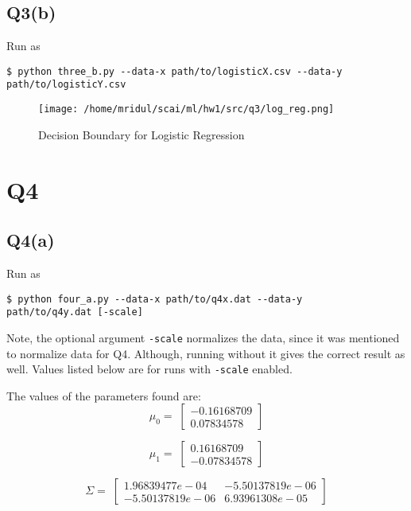\documentclass[11pt]{article}
\begin{document}
\subsection{Q3(b)}
\label{sec:orgeaf4eb5}
\begin{codebox}
Run as
\begin{verbatim}
$ python three_b.py --data-x path/to/logisticX.csv --data-y
path/to/logisticY.csv
\end{verbatim}
\end{codebox}
\begin{figure}[!ht]
\centering
\texttt{[image: /home/mridul/scai/ml/hw1/src/q3/log\_reg.png]}
\caption{\label{fig:org09442ad}Decision Boundary for Logistic Regression}
\end{figure}
\clearpage
\section{Q4}
\label{sec:orgfd67199}
\subsection{Q4(a)}
\label{sec:orgc60505f}
\begin{codebox}
Run as
\begin{verbatim}
$ python four_a.py --data-x path/to/q4x.dat --data-y
path/to/q4y.dat [-scale]
\end{verbatim}
Note, the optional argument \verb|-scale| normalizes the
data, since it was mentioned to normalize data for Q4.
Although, running without it gives the correct result as
well. Values listed below are for runs with \verb|-scale|
enabled.
\end{codebox}
The values of the parameters found are:
\begin{equation*}
\mu_0 = \;
\begin{bmatrix}
-0.16168709\\
0.07834578
\end{bmatrix}
\end{equation*}

\begin{equation*}
\mu_1 = \;
\begin{bmatrix}
0.16168709\\
-0.07834578
\end{bmatrix}
\end{equation*}

\begin{equation*}
\Sigma = \;
\begin{bmatrix}
1.96839477e-04& -5.50137819e-06\\
-5.50137819e-06&  6.93961308e-05
\end{bmatrix}
\end{equation*}
\end{document}
